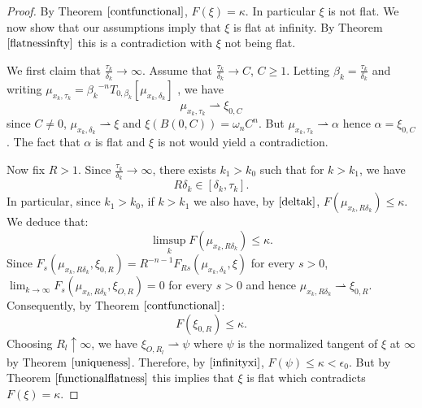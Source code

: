 \documentclass[11pt]{article}
\theoremstyle{definition}
\theoremstyle{remark}
\numberwithin{equation}{section}
\begin{document}
\begin{proof}
By Theorem $\ref{contfunctional}$, $F(\xi)=\kappa$. In particular $\xi$ is not flat.
We now show that our assumptions imply that $\xi$ is flat at infinity. By Theorem $\ref{flatnessinfty}$ this is a contradiction with $\xi$ not being flat.

We first claim that $\frac{\tau_{k}}{\delta_{k}} \to \infty$.
Assume that $\frac{\tau_{k}}{\delta_{k}} \to C$, $C\geq 1$.
Letting $\beta_k = \frac{\tau_{k}}{\delta_{k}}$ and writing $ \mu_{x_k , \tau_{k}} = {\beta_{k}}^{-n} T_{0, \beta_{k}}[\mu_{x_k, \delta_{k}}]$ , we have $$\mu_{x_k , \tau_{k}} \rightharpoonup \xi_{0,C}$$ since $C \neq 0$, $\mu_{x_k, \delta_{k}} \rightharpoonup \xi$ and $\xi(B(0,C))=\omega_{n} C^{n}$.
But $\mu_{x_k , \tau_{k}} \rightharpoonup \alpha$ hence $\alpha=\xi_{0,C}$. The fact that  $\alpha$ is flat and $\xi$ is not would yield a contradiction.

Now fix $R>1$. Since $\frac{\tau_{k}}{\delta_{k}} \to \infty$, there exists $k_1>k_0$ such that for $k>k_1$, we have $$R \delta_{k} \in [\delta_{k} , \tau_{k}].$$
In particular, since $k_1>k_0$, if $k>k_1$ we also have, by $\eqref{deltak}$, $F(\mu_{x_k , R \delta_k}) \leq \kappa$. We deduce that:
$$\limsup_{k} F(\mu_{x_k , R \delta_k} ) \leq \kappa.$$ 
Since $F_{s}(\mu_{x_k , R \delta_k} , \xi_{0,R}) = R^{-n-1} F_{Rs}(\mu_{x_k , \delta_k}, \xi)$ for every $s>0$, $\lim_{k \to \infty} F_{s}(\mu_{x_k , R \delta_k}, \xi_{O,R})=0$ for every $s>0$ and hence $\mu_{x_k , R \delta_k} \rightharpoonup \xi_{0,R}$. Consequently, by Theorem $\ref{contfunctional}$:
\begin{equation}\label{infinityxi}
 F( \xi_{0,R}) \leq \kappa.
\end{equation}
Choosing  $R_l \uparrow \infty$, we have $ \xi_{O,R_l} \rightharpoonup \psi $ where $\psi$ is the normalized tangent of $\xi$ at $\infty$ by Theorem $\ref{uniqueness}$. Therefore, by $\eqref{infinityxi}$, $F(\psi) \leq \kappa < \epsilon_{0}$.
But by Theorem $\ref{functionalflatness}$ this implies  that $\xi$ is flat which contradicts $F(\xi) = \kappa$. 
\end{proof}
\end{document}
